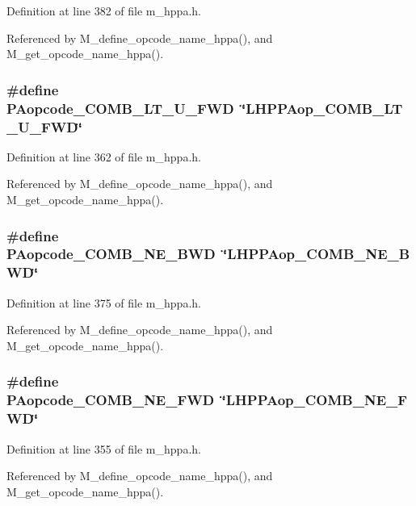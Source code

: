 Definition at line 382 of file m\_\-hppa.h.

Referenced by M\_\-define\_\-opcode\_\-name\_\-hppa(), and M\_\-get\_\-opcode\_\-name\_\-hppa().
\subsubsection{\setlength{\rightskip}{0pt plus 5cm}\#define PAopcode\_\-COMB\_\-LT\_\-U\_\-FWD~\char`\"{}LHPPAop\_\-COMB\_\-LT\_\-U\_\-FWD\char`\"{}}\label{m__hppa_8h_4d9c11f6b09dd21f5e544239fdff368c}




Definition at line 362 of file m\_\-hppa.h.

Referenced by M\_\-define\_\-opcode\_\-name\_\-hppa(), and M\_\-get\_\-opcode\_\-name\_\-hppa().
\subsubsection{\setlength{\rightskip}{0pt plus 5cm}\#define PAopcode\_\-COMB\_\-NE\_\-BWD~\char`\"{}LHPPAop\_\-COMB\_\-NE\_\-BWD\char`\"{}}\label{m__hppa_8h_9d5dd3e7500fb08c8a4d78866c6a058f}




Definition at line 375 of file m\_\-hppa.h.

Referenced by M\_\-define\_\-opcode\_\-name\_\-hppa(), and M\_\-get\_\-opcode\_\-name\_\-hppa().
\subsubsection{\setlength{\rightskip}{0pt plus 5cm}\#define PAopcode\_\-COMB\_\-NE\_\-FWD~\char`\"{}LHPPAop\_\-COMB\_\-NE\_\-FWD\char`\"{}}\label{m__hppa_8h_52ff0586b5efedd328cf02608c8a97d0}




Definition at line 355 of file m\_\-hppa.h.

Referenced by M\_\-define\_\-opcode\_\-name\_\-hppa(), and M\_\-get\_\-opcode\_\-name\_\-hppa().
